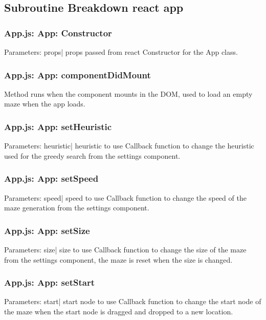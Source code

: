 \documentclass{article}
\begin{document}
\subsection{Subroutine Breakdown react app}
\subsubsection{App.js: App: Constructor}
Parameters:\newline
\indent props| props passed from react\newline
Constructor for the App class.

\subsubsection{App.js: App: componentDidMount}
Method runs when the component mounts in the DOM, used to load an empty maze when the app loads.

\subsubsection{App.js: App: setHeuristic}
Parameters:\newline
\indent heuristic| heuristic to use\newline
Callback function to change the heuristic used for the greedy search from the settings component.

\subsubsection{App.js: App: setSpeed}
Parameters:\newline
\indent speed| speed to use\newline
Callback function to change the speed of the maze generation from the settings component.

\subsubsection{App.js: App: setSize}
Parameters:\newline
\indent size| size to use\newline
Callback function to change the size of the maze from the settings component, the maze is reset when the size is changed.

\subsubsection{App.js: App: setStart}
Parameters:\newline
\indent start| start node to use\newline
Callback function to change the start node of the maze when the start node is dragged and dropped to a new location.
\end{document}

